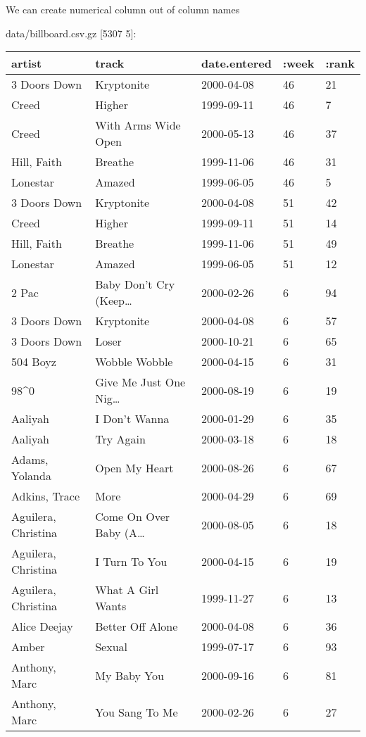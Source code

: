 \documentclass[]{article}
\newenvironment{Shaded}{\begin{snugshade}}{\end{snugshade}}
\newcommand{\StringTok}[1]{\textcolor[rgb]{0.31,0.60,0.02}{#1}}
\newcommand{\SpecialStringTok}[1]{\textcolor[rgb]{0.31,0.60,0.02}{#1}}
\newcommand{\VariableTok}[1]{\textcolor[rgb]{0.00,0.00,0.00}{#1}}
\newcommand{\AttributeTok}[1]{\textcolor[rgb]{0.77,0.63,0.00}{#1}}
\newcommand{\NormalTok}[1]{#1}
\begin{document}
We can create numerical column out of column names

\begin{Shaded}
\end{Shaded}

data/billboard.csv.gz {[}5307 5{]}:

\begin{longtable}[]{@{}lllll@{}}
\toprule
artist & track & date.entered & :week & :rank\tabularnewline
\midrule
\endhead
3 Doors Down & Kryptonite & 2000-04-08 & 46 & 21\tabularnewline
Creed & Higher & 1999-09-11 & 46 & 7\tabularnewline
Creed & With Arms Wide Open & 2000-05-13 & 46 & 37\tabularnewline
Hill, Faith & Breathe & 1999-11-06 & 46 & 31\tabularnewline
Lonestar & Amazed & 1999-06-05 & 46 & 5\tabularnewline
3 Doors Down & Kryptonite & 2000-04-08 & 51 & 42\tabularnewline
Creed & Higher & 1999-09-11 & 51 & 14\tabularnewline
Hill, Faith & Breathe & 1999-11-06 & 51 & 49\tabularnewline
Lonestar & Amazed & 1999-06-05 & 51 & 12\tabularnewline
2 Pac & Baby Don't Cry (Keep\ldots{} & 2000-02-26 & 6 &
94\tabularnewline
3 Doors Down & Kryptonite & 2000-04-08 & 6 & 57\tabularnewline
3 Doors Down & Loser & 2000-10-21 & 6 & 65\tabularnewline
504 Boyz & Wobble Wobble & 2000-04-15 & 6 & 31\tabularnewline
98\^{}0 & Give Me Just One Nig\ldots{} & 2000-08-19 & 6 &
19\tabularnewline
Aaliyah & I Don't Wanna & 2000-01-29 & 6 & 35\tabularnewline
Aaliyah & Try Again & 2000-03-18 & 6 & 18\tabularnewline
Adams, Yolanda & Open My Heart & 2000-08-26 & 6 & 67\tabularnewline
Adkins, Trace & More & 2000-04-29 & 6 & 69\tabularnewline
Aguilera, Christina & Come On Over Baby (A\ldots{} & 2000-08-05 & 6 &
18\tabularnewline
Aguilera, Christina & I Turn To You & 2000-04-15 & 6 & 19\tabularnewline
Aguilera, Christina & What A Girl Wants & 1999-11-27 & 6 &
13\tabularnewline
Alice Deejay & Better Off Alone & 2000-04-08 & 6 & 36\tabularnewline
Amber & Sexual & 1999-07-17 & 6 & 93\tabularnewline
Anthony, Marc & My Baby You & 2000-09-16 & 6 & 81\tabularnewline
Anthony, Marc & You Sang To Me & 2000-02-26 & 6 & 27\tabularnewline
\bottomrule
\end{longtable}
\end{document}
